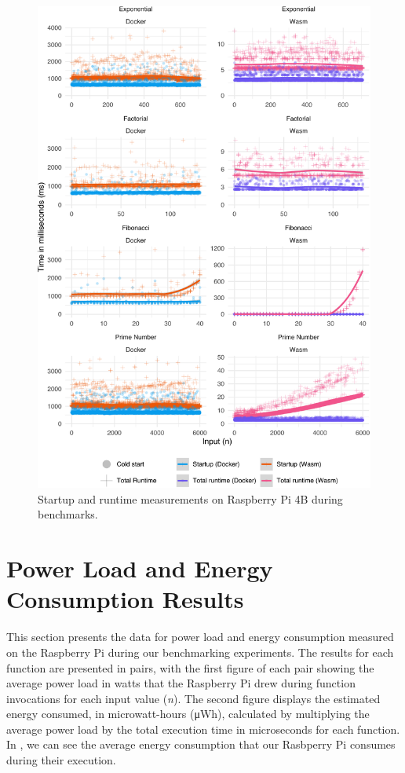 \documentclass[
  table]{report}
\begin{document}
\newpage

\begin{figure}[H]

{\centering \includegraphics{thesis_files/figure-latex/rpi-efficiency-1} 

}

\caption{Startup and runtime measurements on Raspberry Pi 4B during benchmarks.}\label{fig:rpi-efficiency}
\end{figure}

\newpage

\section{Power Load and Energy Consumption Results}

This section presents the data for power load and energy consumption
measured on the Raspberry Pi during our benchmarking experiments. The
results for each function are presented in pairs, with the first figure
of each pair showing the average power load in watts that the Raspberry
Pi drew during function invocations for each input value (\emph{n}). The
second figure displays the estimated energy consumed, in microwatt-hours
(μWh), calculated by multiplying the average power load by the total
execution time in microseconds for each function. In
, we can see the average energy
consumption that our Rasbperry Pi consumes during their execution.
\end{document}
